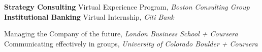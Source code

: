 \vspace{-5ex}
\begin{scholarship}
					{\textbf{Strategy Consulting} Virtual Experience Program, \textit{Boston Consulting Group}}
					{\textbf{Institutional Banking} Virtual Internship, \textit{Citi Bank}}
	
\end{scholarship}

\begin{scholarship}
					{Managing the Company of the future, \textit{London Business School + Coursera}}
					{Communicating effectively in groups, \textit{University of Colorado Boulder + Coursera}}
\end{scholarship}